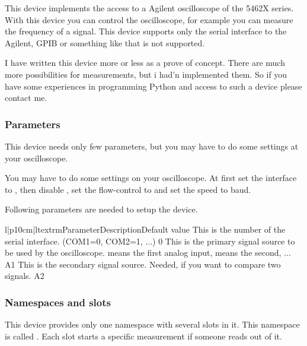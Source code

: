 This device implements the access to a Agilent oscilloscope of the 5462X 
series. With this device you can control the oscilloscope, for example you can
measure the frequency of a signal. This device supports only the serial
interface to the Agilent, GPIB or something like that is not supported.

I have written this device more or less as a prove of concept. There are
much more possibilities for measurements, but i had'n implemented them.
So if you have some experiences in programming Python and access to such
a device please contact me.

\subsubsection{Parameters}
This device needs only few parameters, but you may have to do some settings 
at your oscilloscope. 

\begin{notice} You may have to do some settings on your oscilloscope.
At first set the interface to , then disable ,
set the flow-control to  and set the speed to  baud.
\end{notice}

Following parameters are needed to setup the device.
\begin{tableiii}{l|p{10cm}|l}{textrm}{Parameter}{Description}{Default value}
        {This is the number of the serial interface. (COM1=0, COM2=1, ...)}
        {0}
        {This is the primary signal source to be used by the oscilloscope.
         means the first analog input,  means the second, 
        ...}
        {A1}
        {This is the secondary signal source. Needed, if you want to compare two signals.}
        {A2}
\end{tableiii}

\subsubsection{Namespaces and slots}
This device provides only one namespace with several slots in it. This namespace is called
. Each slot starts a specific measurement if someone reads out of it.

